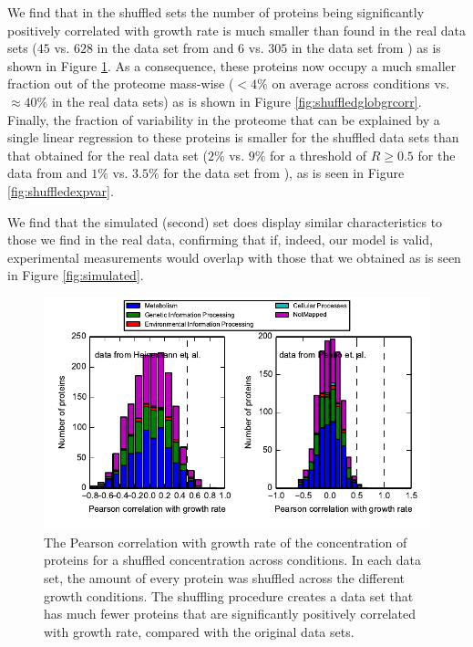 \documentclass[a4paper]{article}
\newcommand{\hGlobal}{$628$}
\newcommand{\hGlobalShuff}{$45$}
\newcommand{\vnGlobalShuff}{$6$}
\newcommand{\vGlobalShuff}{\vnGlobalShuff{}}
\newcommand{\vnGlobal}{$305$}
\newcommand{\vGlobal}{\vnGlobal{}}
\begin{document}
We find that in the shuffled sets the number of proteins being significantly positively correlated with
growth rate is much smaller than found in the real data sets (\hGlobalShuff{} vs. \hGlobal{} in the data set from \cite{Heinemann2015} and \vGlobalShuff{} vs. \vGlobal{} in the data set from \cite{Peebo_2015}) as is shown in Figure \ref{fig:shuffledcorr}.
As a consequence, these proteins now occupy a much smaller fraction out of the proteome mass-wise ($<4\%$ on average across conditions vs. $\approx 40\%$ in the real data sets) as is shown in Figure \ref{fig:shuffledglobgrcorr}.
Finally, the fraction of variability in the proteome that can be explained by a single linear regression to these proteins is smaller for the shuffled data sets than that obtained for the real data set ($2\%$ vs. $9\%$ for a threshold of $R\ge0.5$ for the data from \cite{Heinemann2015} and $1\%$ vs. $3.5\%$ for the data set from \cite{Peebo_2015}), as is seen in Figure \ref{fig:shuffledexpvar}.

We find that the simulated (second) set does display similar characteristics to those we find in the real data, confirming that if, indeed, our model is valid, experimental measurements would overlap with those that we obtained as is seen in Figure \ref{fig:simulated}.

\begin{figure}[H]
\begin{center}
\includegraphics[width=1\columnwidth]{shuffleGrowthRateCorrelation.pdf}
\caption{\label{fig:shuffledcorr}
The Pearson correlation with growth rate of the concentration of proteins for a shuffled concentration across conditions.
In each data set, the amount of every protein was shuffled across the different growth conditions.
The shuffling procedure creates a data set that has much fewer proteins that are significantly positively correlated with growth rate, compared with the original data sets.
}
\end{center}
\end{figure}
\end{document}
